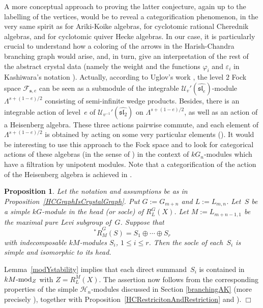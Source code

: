 \documentclass[twoside,12pt]{amsart}
\theoremstyle{plain}
\newenvironment{prf}{{\bf Proof.}}{\hfill $\Box$ \\[-1.0ex]}
\newtheorem{prp}[num]{Proposition}
\begin{document}
A more conceptual approach to proving the latter conjecture, 
again up to the labelling of the vertices,
would be to reveal a categorification phenomenon,
in the very same spirit as \cite{Ariki1996}
for Ariki-Koike algebras, \cite{Shan2008} for cyclotomic rational Cherednik 
algebras, and \cite{BrundanKleshchev2009} for cyclotomic quiver Hecke algebras.
In our case, it is particularly crucial to understand how a coloring
of the arrows in the Harish-Chandra branching graph would arise,
and, in turn, give an interpretation of the rest of the abstract crystal data
(namely the weight and the functions $\varphi_i$ and ${\varepsilon}_i$ 
in Kashiwara's notation \cite[Section 7]{Kashiwara1995}).
Actually, according to Uglov's work \cite{Uglov1999}, the level $2$ Fock space 
${\mathcal{F}}_{{\mathbf{s}},e}$ can be seen as a submodule of the integrable 
${\mathcal{U}}_v'(\widehat{\mathfrak{sl}_e})$-module ${\Lambda}^{s+(1-e)/2}$ consisting of
semi-infinite wedge products. Besides, there is an integrable action of 
level~$e$ of ${\mathcal{U}}_{v^{-1}}'(\widehat{\mathfrak{sl}_2})$ on ${\Lambda}^{s+(1-e)/2}$,
as well as an action of a Heisenberg algebra.
These three actions pairwise commute, and each element of ${\Lambda}^{s+(1-e)/2}$ is 
obtained by acting on some very particular elements (\cite[Theorem 4.8]{Uglov1999}).
It would be interesting to use this approach to the Fock space and to look for 
categorical actions  of these algebras (in the sense of \cite{ChuangRouquier2008}) 
in the context of $kG_n$-modules which have a 
filtration by unipotent modules. 
Note that a categorification 
of the action of the Heisenberg algebra is achieved in \cite{ShanVasserot2012}.

\begin{prp}
\label{SimpleSocle}
Let the notation and assumptions be as in Proposition~\ref{HCGraphIsCrystalGraph}.
Put $G := G_{m+n}$ and $L := L_{m,n}$.
Let~$S$ be a simple $kG$-module in the head (or socle) of $R_L^G( X )$. Let
$M := L_{m+n - 1, 1}$ be the maximal pure Levi subgroup of~$G$. Suppose that
$${^*\!R}_M^G( S ) = S_1 \oplus \cdots \oplus S_r$$
with indecomposable $kM$-modules $S_i$, $1 \leq i \leq r$. Then the socle of 
each~$S_i$ is simple and isomorphic to its head. 
\end{prp}
\begin{prf}
Lemma~\ref{modYstability} implies that each direct summand~$S_i$ is contained 
in $kM\mbox{\rm -mod}_Z$ with $Z = R_L^M( X )$. The assertion now follows from
the corresponding properties of the simple $\mathcal{H}_n$-modules discussed in
Section \ref{branchingAK} (more precisely \cite[Theorem B]{GrojnowskiVazirani2001}),
together with Proposition~\ref{HCRestricitonAndRestriction} and 
\cite[Theorem 2]{Cabanes1990}).
\end{prf}
\end{document}
